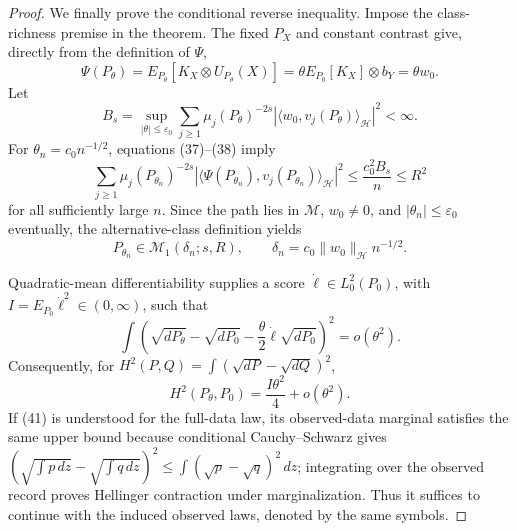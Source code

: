 \documentclass{article}
\begin{document}
\begin{proof}
We finally prove the conditional reverse inequality.  Impose the class-richness premise in the theorem.  The fixed \(P_X\) and constant contrast give, directly from the definition of \(\Psi\),
\[
 \Psi(P_\theta)
 =E_{P_\theta}[K_X\otimes U_{P_\theta}(X)]
 =\theta E_{P_0}[K_X]\otimes b_Y
 =\theta w_0.
 \tag{37}
\]
Let
\[
 B_s=\sup_{|\theta|\leq\varepsilon_0}
 \sum_{j\geq1}\mu_j(P_\theta)^{-2s}
 |\langle w_0,v_j(P_\theta)\rangle_{\mathcal H}|^2<\infty.
 \tag{38}
\]
For \(\theta_n=c_0n^{-1/2}\), equations (37)--(38) imply
\[
 \sum_{j\geq1}\mu_j(P_{\theta_n})^{-2s}
 |\langle\Psi(P_{\theta_n}),v_j(P_{\theta_n})\rangle_{\mathcal H}|^2
 \leq\frac{c_0^2B_s}{n}\leq R^2
 \tag{39}
\]
for all sufficiently large \(n\).  Since the path lies in \(\mathcal M\), \(w_0\ne0\), and \(|\theta_n|\leq\varepsilon_0\) eventually, the alternative-class definition yields
\[
 P_{\theta_n}\in\mathcal M_1(\delta_n;s,R),
 \qquad
 \delta_n=c_0\|w_0\|_{\mathcal H}n^{-1/2}.
 \tag{40}
\]

Quadratic-mean differentiability supplies a score \(\dot\ell\in L^2_0(P_0)\), with \(I=E_{P_0}\dot\ell^2\in(0,\infty)\), such that
\[
 \int\left(
  \sqrt{dP_\theta}-\sqrt{dP_0}
  -\frac{\theta}{2}\dot\ell\sqrt{dP_0}
 \right)^2=o(\theta^2).
 \tag{41}
\]
Consequently, for \(H^2(P,Q)=\int(\sqrt{dP}-\sqrt{dQ})^2\),
\[
 H^2(P_\theta,P_0)=\frac{I\theta^2}{4}+o(\theta^2).
 \tag{42}
\]
If (41) is understood for the full-data law, its observed-data marginal satisfies the same upper bound because conditional Cauchy--Schwarz gives
\(
 (\sqrt{\int p\,dz}-\sqrt{\int q\,dz})^2
 \leq\int(\sqrt p-\sqrt q)^2\,dz
\); integrating over the observed record proves Hellinger contraction under marginalization.  Thus it suffices to continue with the induced observed laws, denoted by the same symbols.


\end{proof}
\end{document}
